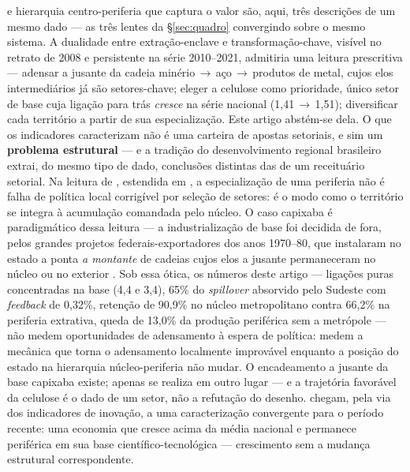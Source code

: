 \documentclass[11pt,a4paper]{article}
\begin{document}
e hierarquia centro-periferia que captura o valor são, aqui, três descrições de um mesmo dado
--- as três lentes da \S\ref{sec:quadro} convergindo sobre o mesmo sistema.
A dualidade entre extração-enclave e
transformação-chave, visível no retrato de 2008 e persistente na série 2010--2021,
admitiria uma leitura prescritiva --- adensar a jusante da cadeia
minério\,$\to$\,aço\,$\to$\,produtos de metal, cujos elos intermediários já são
setores-chave; eleger a celulose como prioridade, único setor de base cuja ligação para trás
\emph{cresce} na série nacional (1,41\,$\to$\,1,51); diversificar cada território a partir de
sua especialização. Este artigo abstém-se dela. O que os indicadores caracterizam não é uma
carteira de apostas setoriais, e sim um \textbf{problema estrutural} --- e a tradição do
desenvolvimento regional brasileiro extrai, do mesmo tipo de dado, conclusões distintas
das de um receituário setorial. Na leitura de \citet{cano1985}, estendida em
\citet{cano2008desconcentracao}, a especialização de uma periferia não é falha de política
local corrigível por seleção de setores: é o modo como o território se integra à
acumulação comandada pelo núcleo. O caso capixaba é paradigmático dessa leitura --- a
industrialização de base foi decidida de fora, pelos grandes projetos
federais-exportadores dos anos 1970--80, que instalaram no estado a ponta \emph{a
montante} de cadeias cujos elos a jusante permaneceram no núcleo ou no exterior
\citep{macedo2002integracao}. Sob essa ótica, os números deste artigo --- ligações puras
concentradas na base (4,4 e 3,4), 65\% do \emph{spillover} absorvido pelo Sudeste com
\emph{feedback} de 0,32\%, retenção de 90,9\% no núcleo metropolitano contra 66,2\% na
periferia extrativa, queda de 13,0\% da produção periférica sem a metrópole --- não medem
oportunidades de adensamento à espera de política: medem a mecânica que torna o
adensamento localmente improvável enquanto a posição do estado na hierarquia
núcleo-periferia não mudar. O encadeamento a jusante da base capixaba existe; apenas se
realiza em outro lugar --- e a trajetória favorável da celulose é o dado de um setor, não
a refutação do desenho. \citet{cacador2009olhar} chegam, pela via dos indicadores de
inovação, a uma caracterização convergente para o período recente: uma economia que cresce
acima da média nacional e permanece periférica em sua base científico-tecnológica ---
crescimento sem a mudança estrutural correspondente.
\end{document}
